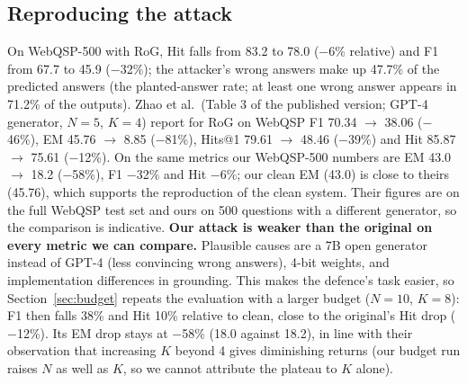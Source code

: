 \documentclass[preprint,12pt]{elsarticle}
\begin{document}
\subsection{Reproducing the attack}\label{sec:attack}
On WebQSP-500 with RoG, Hit falls from 83.2 to 78.0 ($-$6\% relative) and F1 from 67.7 to 45.9 ($-$32\%); the attacker's wrong answers make up 47.7\% of the predicted answers (the planted-answer rate; at least one wrong answer appears in 71.2\% of the outputs). Zhao et al.\ (Table 3 of the published version; GPT-4 generator, $N=5$, $K=4$) report for RoG on WebQSP F1 70.34 $\rightarrow$ 38.06 ($-$46\%), EM 45.76 $\rightarrow$ 8.85 ($-$81\%), Hits@1 79.61 $\rightarrow$ 48.46 ($-$39\%) and Hit 85.87 $\rightarrow$ 75.61 ($-$12\%). On the same metrics our WebQSP-500 numbers are EM 43.0 $\rightarrow$ 18.2 ($-$58\%), F1 $-$32\% and Hit $-$6\%; our clean EM (43.0) is close to theirs (45.76), which supports the reproduction of the clean system. Their figures are on the full WebQSP test set and ours on 500 questions with a different generator, so the comparison is indicative. \textbf{Our attack is weaker than the original on every metric we can compare.} Plausible causes are a 7B open generator instead of GPT-4 (less convincing wrong answers), 4-bit weights, and implementation differences in grounding. This makes the defence's task easier, so Section~\ref{sec:budget} repeats the evaluation with a larger budget ($N=10$, $K=8$): F1 then falls 38\% and Hit 10\% relative to clean, close to the original's Hit drop ($-$12\%). Its EM drop stays at $-$58\% (18.0 against 18.2), in line with their observation that increasing $K$ beyond 4 gives diminishing returns (our budget run raises $N$ as well as $K$, so we cannot attribute the plateau to $K$ alone).
\end{document}
